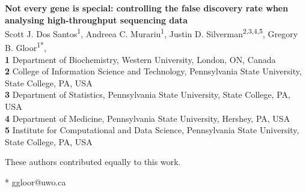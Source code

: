\documentclass[10pt,letterpaper]{article}
\begin{document}
\vspace*{0.2in}

\begin{flushleft}
{\Large
\textbf{Not every gene is special: controlling the false discovery rate when analysing high-throughput sequencing data} %
}
\newline
\\
Scott J. Dos Santos\textsuperscript{1\Yinyang},
Andreea C. Murariu\textsuperscript{1\Yinyang},
Justin D. Silverman\textsuperscript{2,3,4,5},
Gregory B. Gloor\textsuperscript{1*},
\\
\bigskip
\textbf{1} Department of Biochemistry, Western University, London, ON, Canada
\\
\textbf{2} College of Information Science and Technology, Pennsylvania State University, State College, PA, USA
\\
\textbf{3} Department of Statistics, Pennsylvania State University, State College, PA, USA
\\
\textbf{4} Department of Medicine, Pennsylvania State University, Hershey, PA, USA
\\
\textbf{5} Institute for Computational and Data Science, Pennsylvania State University, State College, PA, USA
\\
\bigskip

% 
%
\Yinyang These authors contributed equally to this work.





* ggloor@uwo.ca

\end{flushleft}
\end{document}
